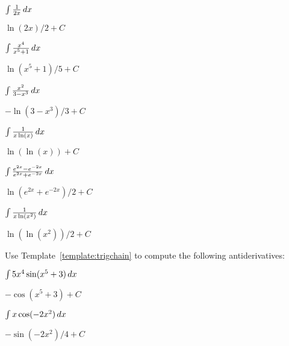 \begin{exercises}
\begin{multicols}{2}
\begin{exercise}
$\int \frac{1}{2x} \, d x$
\begin{answer}
$\ln(2x)/2 + C$
\end{answer}
\end{exercise}

\begin{exercise}
$\int \frac{x^4}{x^5+1} \, d x$
\begin{answer}
$\ln(x^5+1)/5 +C$
\end{answer}
\end{exercise}

\begin{exercise}
$\int \frac{x^2}{3-x^3} \, d x$  
\begin{answer}
$-\ln(3-x^3)/3+C$
\end{answer}
\end{exercise}

\columnbreak

\begin{exercise}
$\int \frac{1}{x\ln(x)} \, d x$ 
\begin{answer}
$\ln(\ln(x))+C$
\end{answer}
\end{exercise}

\begin{exercise}
$\int \frac{e^{2x}-e^{-2x}}{e^{2x}+e^{-2x}} \, d x$ 
\begin{answer}
$\ln(e^{2x}+e^{-2x})/2 +C$
\end{answer}
\end{exercise}
\end{multicols}

\begin{exercise}
$\int \frac{1}{x\ln(x^2)} \, d x$ 
\begin{answer}
$\ln(\ln(x^2))/2 + C$
\end{answer}
\end{exercise}


\noindent Use Template~\ref{template:trigchain} to compute the
following antiderivatives:


\begin{multicols}{2}
\begin{exercise}
$\int 5x^4 \sin(x^5+3) \, d x$ 
\begin{answer}
$-\cos(x^5+3) +C$
\end{answer}
\end{exercise}

\begin{exercise}
$\int x \cos(-2x^2) \, d x$
\begin{answer}
$-\sin(-2x^2)/4 +C$
\end{answer}
\end{exercise}


\end{multicols}
\end{exercises}
